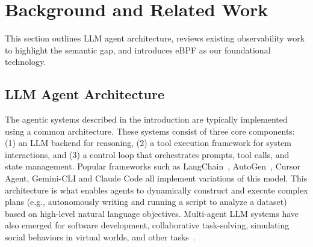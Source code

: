\section{Background and Related Work}

This section outlines LLM agent architecture, reviews existing observability work to highlight the semantic gap, and introduces eBPF as our foundational technology.


\subsection{LLM Agent Architecture}
The agentic systems described in the introduction are typically implemented using a common architecture. These systems consist of three core components: (1) an LLM backend for reasoning, (2) a tool execution framework for system interactions, and (3) a control loop that orchestrates prompts, tool calls, and state management. Popular frameworks such as LangChain~\cite{langchain}, AutoGen~\cite{autogen}, Cursor Agent\cite{cursor}, Gemini-CLI\cite{geminicli} and Claude Code\cite{claudecode} all implement variations of this model. This architecture is what enables agents to dynamically construct and execute complex plans (e.g., autonomously writing and running a script to analyze a dataset) based on high-level natural language objectives. Multi-agent LLM systems have also emerged for software development, collaborative task-solving, simulating social behaviors in virtual worlds, and other tasks~\cite{guo2024survey,tran2025survey}.


